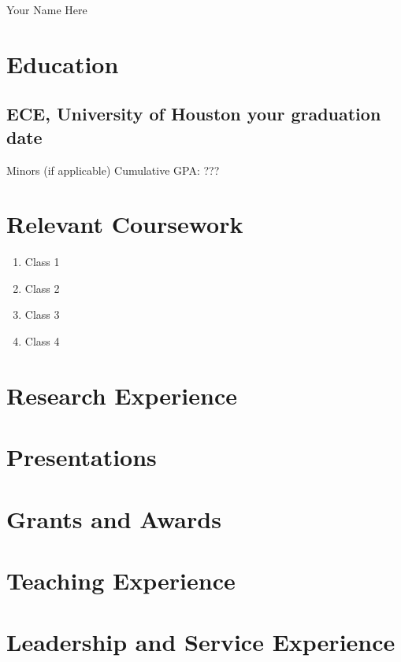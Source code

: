 \documentclass[11pt]{article}
\begin{document}
\centerline{\huge{Your Name Here}}

\section{Education}
\subsection{ECE, University of Houston \hfill your graduation date}
Minors (if applicable)
\newline Cumulative GPA: ???

\section{Relevant Coursework}
\begin{enumerate}
    \item Class 1
    \item Class 2
    \item Class 3
    \item Class 4
\end{enumerate}

\section{Research Experience}

\section{Presentations}

\section{Grants and Awards}

\section{Teaching Experience}

\section{Leadership and Service Experience}
\end{document}
